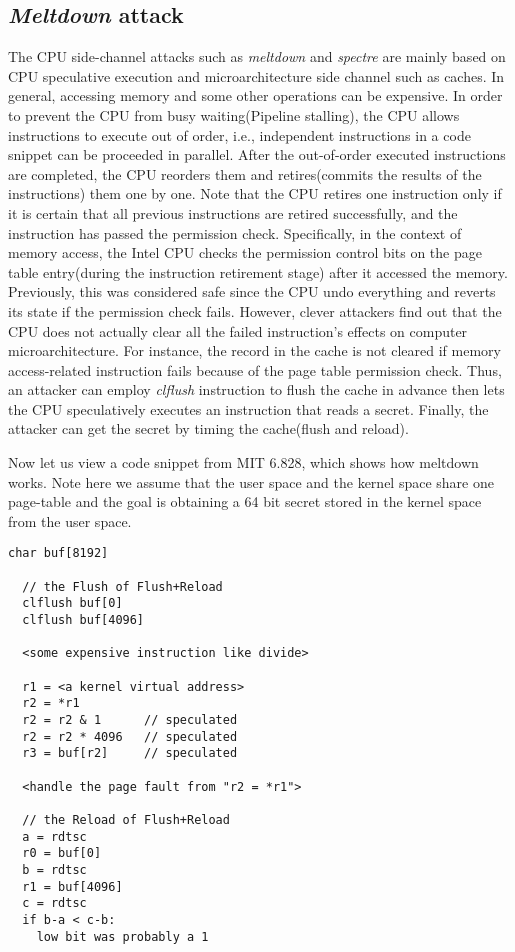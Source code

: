  
 
 
 

 

 




 
 
\subsection{\emph{Meltdown} attack}

The CPU side-channel attacks such as \emph{meltdown}\cite{3} and \emph{spectre}\cite{4} are mainly based on 
CPU speculative execution and microarchitecture side channel such as caches. 
In general, accessing memory and some other operations can be expensive. 
In order to prevent the CPU from busy waiting(Pipeline stalling), 
the CPU allows instructions to execute out of order, i.e., independent 
instructions in a code snippet can be proceeded in parallel. After the out-of-order 
executed instructions are completed,  the CPU reorders them and retires(commits the 
results of the instructions) them one by one. Note that the CPU retires one instruction 
only if it is certain that all previous instructions are retired successfully, and the 
instruction has passed the permission check.  Specifically, in the context of memory access, 
the Intel CPU checks the permission control bits on the page table entry(during the 
instruction retirement stage) after it accessed the memory. 
Previously, this was considered safe since the CPU undo everything and reverts 
its state if the permission check fails.
However, clever attackers find out that the CPU does not actually clear all the 
failed instruction's effects on computer microarchitecture. For instance, 
the record in the cache is not cleared if memory access-related instruction 
fails because of the page table permission check. Thus, an attacker can employ 
\emph{clflush} instruction to flush the cache in advance then lets the CPU speculatively 
executes an instruction that reads a secret. Finally, the attacker can get the secret 
by timing the cache(flush and reload\cite{11}).

Now let us view a code snippet from MIT 6.828\cite{1}, which shows how meltdown works. Note here we assume that the user space and the 
kernel space share one page-table and the goal is obtaining a 64 bit secret stored in the kernel space from the user space. 
\begin{lstlisting}[style=CStyle]
  char buf[8192]

  // the Flush of Flush+Reload
  clflush buf[0]
  clflush buf[4096]

  <some expensive instruction like divide>

  r1 = <a kernel virtual address>
  r2 = *r1
  r2 = r2 & 1      // speculated
  r2 = r2 * 4096   // speculated
  r3 = buf[r2]     // speculated

  <handle the page fault from "r2 = *r1">

  // the Reload of Flush+Reload
  a = rdtsc
  r0 = buf[0]
  b = rdtsc
  r1 = buf[4096]
  c = rdtsc
  if b-a < c-b:
    low bit was probably a 1
\end{lstlisting}

